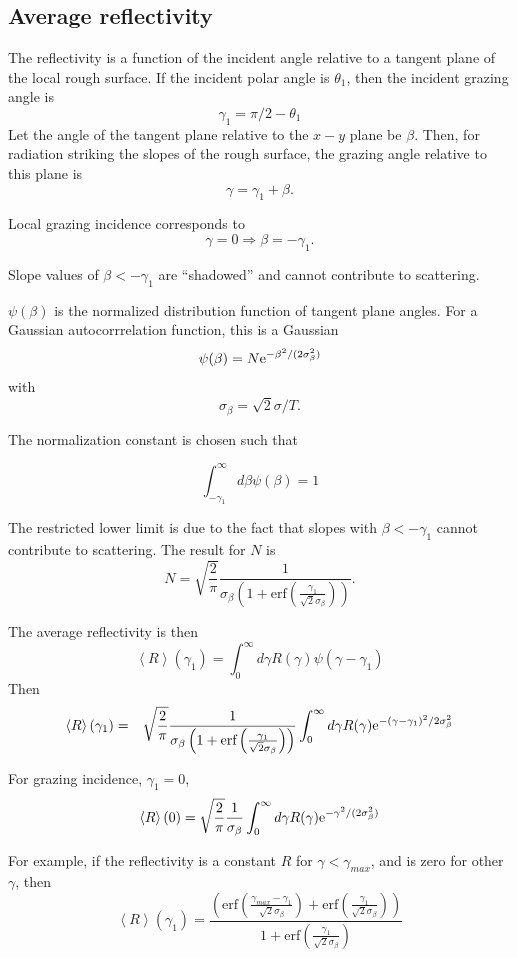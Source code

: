 \documentclass[11pt]{article}
\newcommand{\e}{{\rm e}}
\begin{document}
{{{{%
\subsection{Average reflectivity}

The reflectivity is a function of the incident angle relative to a
tangent plane of the local rough surface. If the incident polar angle
is $\theta_{1}$, then the incident grazing angle is
  $$\gamma_{1}=\pi/2-\theta_{1}$$
Let the angle of the tangent plane relative to the $x-y$ plane be
$\beta$. Then, for radiation striking the slopes of the rough surface,
the grazing angle relative to this plane is
  $$\gamma=\gamma_{1}+\beta.$$

Local grazing incidence corresponds to $$\gamma=0\Rightarrow \beta=-\gamma_{1}.$$

Slope values of $\beta <-\gamma_{1}$ are ``shadowed'' and cannot contribute to scattering.

$\psi(\beta)$ is the normalized distribution function of tangent plane
angles. For a Gaussian autocorrrelation function, this is a Gaussian
  $$\psi(\beta)=N\e^{-\beta^{2}/(2\sigma_{\beta}^{2})}$$
with
  $$\sigma_{\beta}=\sqrt{2}\sigma/T.$$

The normalization constant is chosen such that 

$$\int_{-\gamma_{1}}^{\infty}d\beta\psi(\beta)=1$$

The restricted lower limit is due to the fact that slopes with $\beta
<-\gamma_{1}$ cannot contribute to scattering.  The result for $N$ is
$$N=\sqrt{\frac{2}{\pi}}\frac{1}{\sigma_{\beta}
\left(1+\textrm{erf}\left(\frac{\gamma_{1}}{\sqrt{2}\sigma_{\beta}}\right)\right)}.$$

The average reflectivity is then
  $$\left<R\right>(\gamma_{1})=\int_{0}^{\infty} d\gamma R(\gamma)\psi(\gamma-\gamma_{1})$$
Then
  \begin{eqnarray}
\left<R\right>(\gamma_{1})&=&
\sqrt{\frac{2}{\pi}}\frac{1}{\sigma_{\beta}\left(1+\textrm{erf}
\left(\frac{\gamma_{1}}{\sqrt{2}\sigma_{\beta}}\right)\right)}
\int_{0}^{\infty} d\gamma R(\gamma)\e^{-(\gamma-\gamma_{1})^{2}/2\sigma_{\beta}^{2}}\\
  \end{eqnarray}


For grazing incidence, $\gamma_{1}=0$,
$$\left<R\right>(0)=
\sqrt{\frac{2}{\pi}}\frac{1}{\sigma_{\beta}}\int_{0}^{\infty} d\gamma R(\gamma)\e^{-\gamma^{2}/(2\sigma_{\beta}^{2})}$$

For example, if the reflectivity is a constant $R$ for $\gamma<\gamma_{max}$, and is zero for other $\gamma$, then
  $$\left<R\right>(\gamma_{1})=
\frac{\left(\textrm{erf}\left(\frac{\gamma_{max}-\gamma_{1}}{\sqrt{2}\sigma_{\beta}}\right)+
\textrm{erf}\left(\frac{\gamma_{1}}{\sqrt{2}\sigma_{\beta}}\right)\right)}{1+\textrm{erf}
\left(\frac{\gamma_{1}}{\sqrt{2}\sigma_{\beta}}\right)}$$

}}}}
\end{document}

